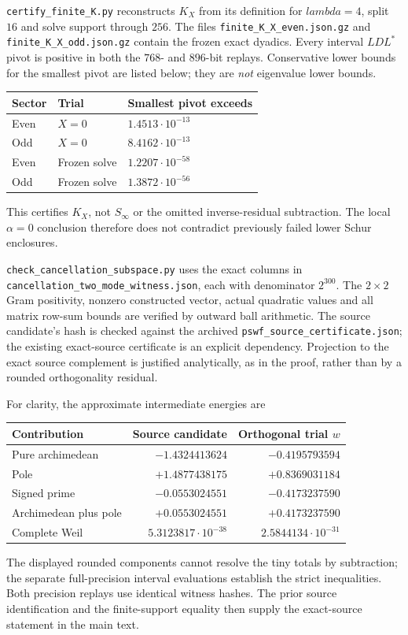 \documentclass[11pt]{article}
\def\lambda{lambda}%
\theoremstyle{remark}
\begin{document}
\texttt{certify\_finite\_K.py} reconstructs $K_X$ from its definition
for $\lambda=4$, split $16$ and solve support through $256$.
The files \texttt{finite\_K\_X\_even.json.gz} and
\texttt{finite\_K\_X\_odd.json.gz} contain the frozen exact dyadics.
Every interval $LDL^*$ pivot is positive in both the $768$- and
$896$-bit replays. Conservative lower bounds for the smallest pivot
are listed below; they are \emph{not} eigenvalue lower bounds.
\begin{center}
\begin{tabular}{@{}lll@{}}
\toprule Sector & Trial & Smallest pivot exceeds\\\midrule
Even & $X=0$ & $1.4513\cdot10^{-13}$\\
Odd & $X=0$ & $8.4162\cdot10^{-13}$\\
Even & Frozen solve & $1.2207\cdot10^{-58}$\\
Odd & Frozen solve & $1.3872\cdot10^{-56}$\\\bottomrule
\end{tabular}
\end{center}
This certifies $K_X$, not $S_\infty$ or the omitted inverse-residual
subtraction. The local $\alpha=0$ conclusion therefore does not
contradict previously failed lower Schur enclosures.

\nolinkurl{check_cancellation_subspace.py} uses the exact columns in
\nolinkurl{cancellation_two_mode_witness.json}, each with denominator
$2^{300}$. The $2\times2$ Gram positivity, nonzero constructed vector,
actual quadratic values and all matrix row-sum bounds are verified by
outward ball arithmetic. The source candidate's hash is checked
against the archived \texttt{pswf\_source\_certificate.json}; the
existing exact-source certificate is an explicit dependency.
Projection to the exact source complement is justified analytically,
as in the proof, rather than by a rounded orthogonality residual.

For clarity, the approximate intermediate energies are
\begin{center}
\begin{tabular}{@{}lrr@{}}
\toprule Contribution & Source candidate & Orthogonal trial $w$\\\midrule
Pure archimedean & $-1.4324413624$ & $-0.4195793594$\\
Pole & $+1.4877438175$ & $+0.8369031184$\\
Signed prime & $-0.0553024551$ & $-0.4173237590$\\
Archimedean plus pole & $+0.0553024551$ & $+0.4173237590$\\
Complete Weil & $5.3123817\cdot10^{-38}$ & $2.5844134\cdot10^{-31}$\\
\bottomrule
\end{tabular}
\end{center}
The displayed rounded components cannot resolve the tiny totals by
subtraction; the separate full-precision interval evaluations establish
the strict inequalities. Both precision replays use identical witness
hashes. The prior source identification and the finite-support equality
then supply the exact-source statement in the main text.
\end{document}
